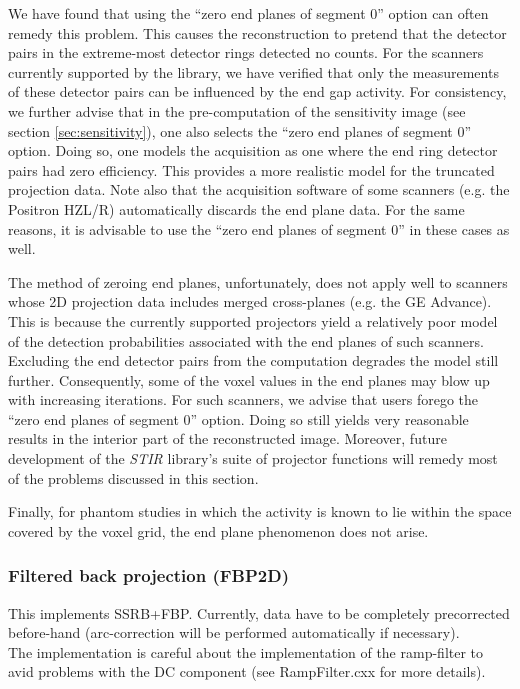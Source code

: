 \documentclass{article}
\begin{document}
We have found that using the ``zero end planes of segment 0'' 
option can often remedy this problem. This causes the reconstruction 
to pretend that the detector pairs in the extreme-most detector 
rings detected no counts. For the scanners currently supported 
by the library, we have verified that only the measurements of 
these detector pairs can be influenced by the end gap activity. 
For consistency, we further advise that in the pre-computation 
of the sensitivity image (see section \ref{sec:sensitivity}), one also selects 
the ``zero end planes of segment 0'' option. Doing so, one models 
the acquisition as one where the end ring detector pairs had 
zero efficiency. This provides a more realistic model for the 
truncated projection data. Note also that the acquisition software 
of some scanners (e.g. the Positron HZL/R) automatically discards 
the end plane data. For the same reasons, it is advisable to 
use the ``zero end planes of segment 0'' in these cases as well.



The method of zeroing end planes, unfortunately, does not apply 
well to scanners whose 2D projection data includes merged cross-planes 
(e.g. the GE Advance). This is because the currently supported 
projectors yield a relatively poor model of the detection probabilities 
associated with the end planes of such scanners. Excluding the 
end detector pairs from the computation degrades the model still 
further. Consequently, some of the voxel values in the end planes 
may blow up with increasing iterations. For such scanners, we 
advise that users forego the ``zero end planes of segment 0'' 
option. Doing so still yields very reasonable results in the 
interior part of the reconstructed image. Moreover, future development 
of the \textit{STIR} library's suite of projector functions will remedy 
most of the problems discussed in this section.


Finally, for phantom studies in which the activity is known to 
lie within the space covered by the voxel grid, the end plane 
phenomenon does not arise.



\subsubsection{
Filtered back projection (FBP2D)}

This implements SSRB+FBP. Currently, data have to be completely 
precorrected before-hand (arc-correction will be performed automatically
if necessary).\\
The implementation is careful about the implementation of the 
ramp-filter to avid problems with the DC component (see RampFilter.cxx 
for more details).
\end{document}

